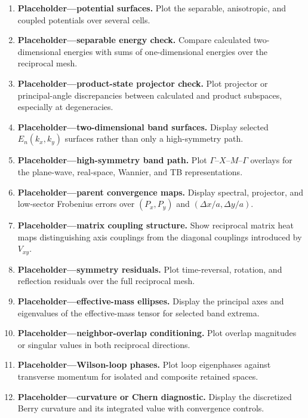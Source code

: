 \begin{enumerate}
    \item \textbf{Placeholder---potential surfaces.} Plot the separable,
          anisotropic, and coupled potentials over several cells.
    \item \textbf{Placeholder---separable energy check.} Compare calculated
          two-dimensional energies with sums of one-dimensional energies over
          the reciprocal mesh.
    \item \textbf{Placeholder---product-state projector check.} Plot projector
          or principal-angle discrepancies between calculated and product
          subspaces, especially at degeneracies.
    \item \textbf{Placeholder---two-dimensional band surfaces.} Display
          selected $E_n(k_x,k_y)$ surfaces rather than only a high-symmetry
          path.
    \item \textbf{Placeholder---high-symmetry band path.} Plot
          $\Gamma$--$X$--$M$--$\Gamma$ overlays for the plane-wave, real-space,
          Wannier, and TB representations.
    \item \textbf{Placeholder---parent convergence maps.} Display spectral,
          projector, and low-sector Frobenius errors over
          $(P_x,P_y)$ and $(\Delta x/a,\Delta y/a)$.
    \item \textbf{Placeholder---matrix coupling structure.} Show reciprocal
          matrix heat maps distinguishing axis couplings from the diagonal
          couplings introduced by $V_{xy}$.
    \item \textbf{Placeholder---symmetry residuals.} Plot time-reversal,
          rotation, and reflection residuals over the full reciprocal mesh.
    \item \textbf{Placeholder---effective-mass ellipses.} Display the principal
          axes and eigenvalues of the effective-mass tensor for selected band
          extrema.
    \item \textbf{Placeholder---neighbor-overlap conditioning.} Plot overlap
          magnitudes or singular values in both reciprocal directions.
    \item \textbf{Placeholder---Wilson-loop phases.} Plot loop eigenphases
          against transverse momentum for isolated and composite retained
          spaces.
    \item \textbf{Placeholder---curvature or Chern diagnostic.} Display the
          discretized Berry curvature and its integrated value with convergence
          controls.

\end{enumerate}
